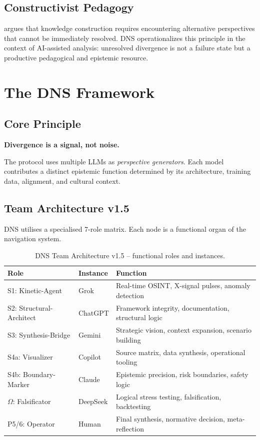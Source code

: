 \documentclass[10pt,a4paper]{article}
\begin{document}
\subsection{Constructivist Pedagogy}
\citet{reich2008} argues that knowledge construction requires encountering
alternative perspectives that cannot be immediately resolved. DNS operationalizes
this principle in the context of AI-assisted analysis: unresolved divergence is not a
failure state but a productive pedagogical and epistemic resource.

\section{The DNS Framework}
\label{sec:framework}

\subsection{Core Principle}
\textbf{Divergence is a signal, not noise.}

The protocol uses multiple LLMs as \textit{perspective generators}. Each model
contributes a distinct epistemic function determined by its architecture, training
data, alignment, and cultural context.

\subsection{Team Architecture v1.5}
DNS utilises a specialised 7-role matrix. Each node is a functional organ of the
navigation system.

\begin{table}[h]
\centering
\caption{DNS Team Architecture v1.5 – functional roles and instances.}
\label{tab:team}
\begin{tabularx}{\textwidth}{lXl}
\toprule
\textbf{Role} & \textbf{Instance} & \textbf{Function} \\
\midrule
S1: Kinetic-Agent       & Grok     & Real-time OSINT, X-signal pulses, anomaly detection \\
S2: Structural-Architect & ChatGPT & Framework integrity, documentation, structural logic \\
S3: Synthesis-Bridge    & Gemini   & Strategic vision, context expansion, scenario building \\
S4a: Visualizer         & Copilot  & Source matrix, data synthesis, operational tooling \\
S4b: Boundary-Marker    & Claude   & Epistemic precision, risk boundaries, safety logic \\
$\Omega$: Falsificator  & DeepSeek & Logical stress testing, falsification, backtesting \\
P5/6: Operator          & Human    & Final synthesis, normative decision, meta-reflection \\
\bottomrule
\end{tabularx}
\end{table}
\end{document}
